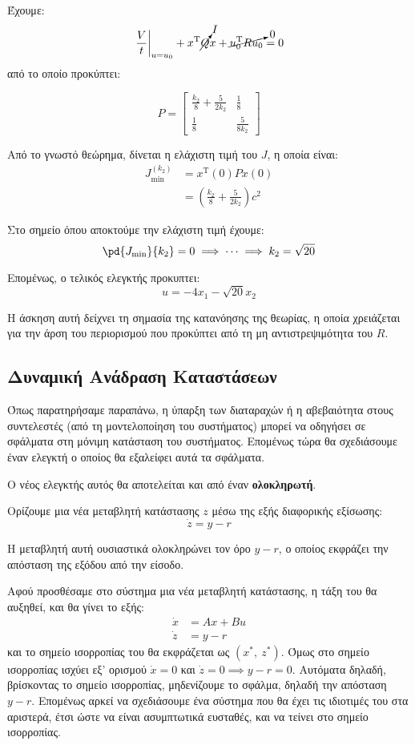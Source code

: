 \documentclass[11pt,a4paper,notitlepage,fleqn]{article}
\let\mytodo\todo
\renewcommand{\todo}[1]{\par\mytodo[inline,noline]{#1}}
\begin{document}
\begin{exercise}
	Έχουμε:
	\[
	\left.\frac{V}{t}\right|_{u=u_0}
	+x^{\mathrm T} \cancelto{I}{Q} x
	+\cancelto{0}{u_0^{\mathrm T} R u_0} = 0
	\]
	από το οποίο προκύπτει: \todo{πράξεις}
	\[
	P = \left[\begin{matrix}
	\frac{k_2}{8} + \frac{5}{2k_2} & \frac{1}{8}\\
	\frac{1}{8} & \frac{5}{8k_2}
	\end{matrix}\right]
	\]
	
	Από το γνωστό θεώρημα, δίνεται η ελάχιστη τιμή του \( J \), η οποία
	είναι:
	\begin{align*}
		J_{\min}^{(k_2)} &= x^{\mathrm{T}}(0) P x(0)\\ &=
		\left(\frac{k_2}{8} + \frac{5}{2k_2}\right)c^2
	\end{align*}
	
	Στο σημείο όπου αποκτούμε την ελάχιστη τιμή έχουμε:
	\[
	\pd{J_{\min}}{k_2} = 0 \implies \dots \implies k_2 = \sqrt{20}
	\]
	
	Επομένως, ο τελικός ελεγκτής προκυπτει:
	\[
	u  = -4x_1 - \sqrt{20}x_2
	\]
	
	Η άσκηση αυτή δείχνει τη σημασία της κατανόησης της θεωρίας, η οποία
	χρειάζεται για την άρση του περιορισμού που προκύπτει από τη
	μη αντιστρεψιμότητα του \( R \).
\end{exercise}

\subsection{Δυναμική Ανάδραση Καταστάσεων}
Όπως παρατηρήσαμε παραπάνω, η ύπαρξη των διαταραχών ή η αβεβαιότητα
στους συντελεστές (από τη μοντελοποίηση του συστήματος) μπορεί να
οδηγήσει σε σφάλματα στη μόνιμη κατάσταση του συστήματος. Επομένως
τώρα θα σχεδιάσουμε έναν ελεγκτή ο οποίος θα εξαλείφει αυτά τα σφάλματα.

Ο νέος ελεγκτής αυτός θα αποτελείται και από έναν \textbf{ολοκληρωτή}.

Ορίζουμε μια νέα μεταβλητή κατάστασης \( z \) μέσω της εξής διαφορικής
εξίσωσης:
\[
\dot z = y - r
\]

Η μεταβλητή αυτή ουσιαστικά ολοκληρώνει τον όρο \( y-r \), ο οποίος εκφράζει την απόσταση της εξόδου από την είσοδο.

Αφού προσθέσαμε στο σύστημα μια νέα μεταβλητή κατάστασης, η τάξη του θα αυξηθεί, και θα γίνει το εξής:
\begin{align*}
    \dot x &= Ax+Bu\\
	\dot z &= y-r
\end{align*}
και το σημείο ισορροπίας του θα εκφράζεται ως \( (x^*,\ z^*) \). Όμως
στο σημείο ισορροπίας ισχύει εξ' ορισμού \( \dot x = 0 \) και \( \dot z = 0 \implies y-r = 0 \). Αυτόματα δηλαδή, βρίσκοντας το σημείο ισορροπίας,
μηδενίζουμε το σφάλμα, δηλαδή την απόσταση \( y-r \). Επομένως
αρκεί να σχεδιάσουμε ένα σύστημα που θα έχει τις ιδιοτιμές του στα
αριστερά, έτσι ώστε να είναι ασυμπτωτικά ευσταθές, και να τείνει στο
σημείο ισορροπίας.
\end{document}
